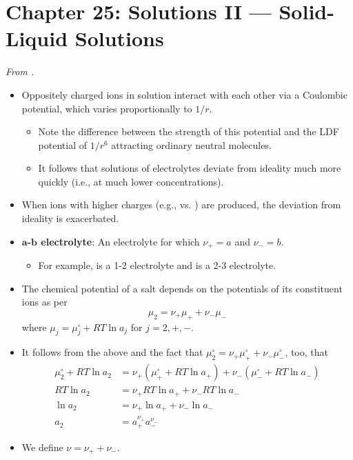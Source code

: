 \documentclass[../notes.tex]{subfiles}
\begin{document}
\section{Chapter 25: Solutions II --- Solid-Liquid Solutions}
\emph{From \textcite{bib:McQuarrieSimon}.}
\begin{itemize}
    \item {}Oppositely charged ions in solution interact with each other via a Coulombic potential, which varies proportionally to $1/r$.
    \begin{itemize}
        \item Note the difference between the strength of this potential and the LDF potential of $1/r^6$ attracting ordinary neutral molecules.
        \item It follows that solutions of electrolytes deviate from ideality much more quickly (i.e., at much lower concentrations).
    \end{itemize}
    \item When ions with higher charges (e.g.,  vs. ) are produced, the deviation from ideality is exacerbated.
    \item \textbf{$\bm{a}$-$\bm{b}$ electrolyte}: An electrolyte for which $\nu_+=a$ and $\nu_-=b$.
    \begin{itemize}
        \item For example,  is a 1-2 electrolyte and  is a 2-3 electrolyte.
    \end{itemize}
    \item The chemical potential of a salt depends on the potentials of its constituent ions as per
    \begin{equation*}
        \mu_2 = \nu_+\mu_++\nu_-\mu_-
    \end{equation*}
    where $\mu_j=\mu_j^\circ+RT\ln a_j$ for $j=2,+,-$.
    \item It follows from the above and the fact that $\mu_2^\circ=\nu_+\mu_+^\circ+\nu_-\mu_-^\circ$, too, that
    \begin{align*}
        \mu_2^\circ+RT\ln a_2 &= \nu_+(\mu_+^\circ+RT\ln a_+)+\nu_-(\mu_-^\circ+RT\ln a_-)\\
        RT\ln a_2 &= \nu_+RT\ln a_++\nu_-RT\ln a_-\\
        \ln a_2 &= \nu_+\ln a_++\nu_-\ln a_-\\
        a_2 &= a_+^{\nu_+}a_-^{\nu_-}
    \end{align*}
    \item We define $\nu=\nu_++\nu_-$.

\end{itemize}
\end{document}
